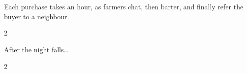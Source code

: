 \composeBailey

\section*{\baileyname}

\baileydesc

Each purchase takes an hour, as farmers chat, then barter, and finally refer the buyer to a neighbour.

\bigLine

\begin{multicols}{2}

\baileymarkets

\baileymarketsWide

\end{multicols}

\vfill
{\hfill\sffamily After the night falls\ldots}

\clearpage

\begin{multicols}{2}

\baileyback

\end{multicols}

